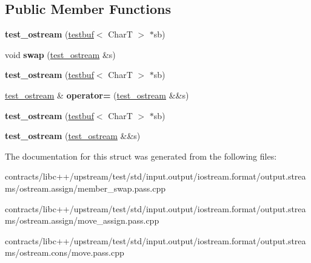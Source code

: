 \subsection*{Public Member Functions}
\begin{DoxyCompactItemize}
\item 
\mbox{\label{structtest__ostream_a1b497d43eb435131ec401ca6e5bd2cb6}} 
{\bfseries test\+\_\+ostream} (\mbox{\hyperlink{structtestbuf}{testbuf}}$<$ CharT $>$ $\ast$sb)
\item 
\mbox{\label{structtest__ostream_a8466280e7d3fef37b60e750552db4acb}} 
void {\bfseries swap} (\mbox{\hyperlink{structtest__ostream}{test\+\_\+ostream}} \&s)
\item 
\mbox{\label{structtest__ostream_a1b497d43eb435131ec401ca6e5bd2cb6}} 
{\bfseries test\+\_\+ostream} (\mbox{\hyperlink{structtestbuf}{testbuf}}$<$ CharT $>$ $\ast$sb)
\item 
\mbox{\label{structtest__ostream_a48ccee4af06c19c19c2813316c1b6c66}} 
\mbox{\hyperlink{structtest__ostream}{test\+\_\+ostream}} \& {\bfseries operator=} (\mbox{\hyperlink{structtest__ostream}{test\+\_\+ostream}} \&\&s)
\item 
\mbox{\label{structtest__ostream_a1b497d43eb435131ec401ca6e5bd2cb6}} 
{\bfseries test\+\_\+ostream} (\mbox{\hyperlink{structtestbuf}{testbuf}}$<$ CharT $>$ $\ast$sb)
\item 
\mbox{\label{structtest__ostream_a15ad1d7e795c2d1ad395a185637e6ec3}} 
{\bfseries test\+\_\+ostream} (\mbox{\hyperlink{structtest__ostream}{test\+\_\+ostream}} \&\&s)
\end{DoxyCompactItemize}


The documentation for this struct was generated from the following files\+:\begin{DoxyCompactItemize}
\item 
contracts/libc++/upstream/test/std/input.\+output/iostream.\+format/output.\+streams/ostream.\+assign/member\+\_\+swap.\+pass.\+cpp\item 
contracts/libc++/upstream/test/std/input.\+output/iostream.\+format/output.\+streams/ostream.\+assign/move\+\_\+assign.\+pass.\+cpp\item 
contracts/libc++/upstream/test/std/input.\+output/iostream.\+format/output.\+streams/ostream.\+cons/move.\+pass.\+cpp\end{DoxyCompactItemize}
